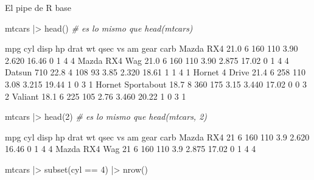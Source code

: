 \documentclass[
  ignorenonframetext,
  aspectratio=169]{beamer}
\newenvironment{Shaded}{\begin{snugshade}}{\end{snugshade}}
\newcommand{\CommentTok}[1]{\textcolor[rgb]{0.56,0.35,0.01}{\textit{#1}}}
\newcommand{\DecValTok}[1]{\textcolor[rgb]{0.00,0.00,0.81}{#1}}
\newcommand{\FunctionTok}[1]{\textcolor[rgb]{0.00,0.00,0.00}{#1}}
\newcommand{\NormalTok}[1]{#1}
\newcommand{\SpecialCharTok}[1]{\textcolor[rgb]{0.00,0.00,0.00}{#1}}
\let\oldverbatim\verbatim
\let\endoldverbatim\endverbatim
\renewenvironment{verbatim}{\tiny\oldverbatim}{\endoldverbatim}
\begin{document}
\begin{frame}[fragile]{El pipe de R base}
\protect\hypertarget{el-pipe-de-r-base}{}
\begin{Shaded}
\begin{Highlighting}[]
\NormalTok{mtcars }\SpecialCharTok{|\textgreater{}} \FunctionTok{head}\NormalTok{()  }\CommentTok{\#  es lo mismo que head(mtcars)}
\end{Highlighting}
\end{Shaded}

\begin{verbatim}
                   mpg cyl disp  hp drat    wt  qsec vs am gear carb
Mazda RX4         21.0   6  160 110 3.90 2.620 16.46  0  1    4    4
Mazda RX4 Wag     21.0   6  160 110 3.90 2.875 17.02  0  1    4    4
Datsun 710        22.8   4  108  93 3.85 2.320 18.61  1  1    4    1
Hornet 4 Drive    21.4   6  258 110 3.08 3.215 19.44  1  0    3    1
Hornet Sportabout 18.7   8  360 175 3.15 3.440 17.02  0  0    3    2
Valiant           18.1   6  225 105 2.76 3.460 20.22  1  0    3    1
\end{verbatim}

\begin{Shaded}
\begin{Highlighting}[]
\NormalTok{mtcars }\SpecialCharTok{|\textgreater{}} \FunctionTok{head}\NormalTok{(}\DecValTok{2}\NormalTok{) }\CommentTok{\#  es lo mismo que  head(mtcars, 2)}
\end{Highlighting}
\end{Shaded}

\begin{verbatim}
              mpg cyl disp  hp drat    wt  qsec vs am gear carb
Mazda RX4      21   6  160 110  3.9 2.620 16.46  0  1    4    4
Mazda RX4 Wag  21   6  160 110  3.9 2.875 17.02  0  1    4    4
\end{verbatim}

\begin{Shaded}
\begin{Highlighting}[]
\NormalTok{mtcars }\SpecialCharTok{|\textgreater{}} \FunctionTok{subset}\NormalTok{(cyl }\SpecialCharTok{==} \DecValTok{4}\NormalTok{) }\SpecialCharTok{|\textgreater{}} \FunctionTok{nrow}\NormalTok{()  }
\end{Highlighting}
\end{Shaded}

\begin{verbatim}
[1] 11
\end{verbatim}
\end{frame}
\end{document}
